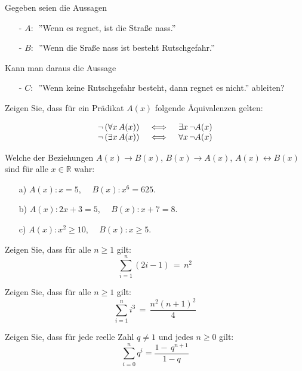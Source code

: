 \begin{aufgabe} Gegeben seien die Aussagen
\begin{itemize}
\item[-] $A:\,$ ''Wenn es regnet, ist die Straße nass.''
\item[-] $B:\,$ ''Wenn die Sraße nass ist besteht Rutschgefahr.''
\end{itemize}
Kann man daraus die Aussage
\begin{itemize}
\item[-] $C:\,$ ''Wenn keine Rutschgefahr besteht, dann regnet es nicht.'' ableiten? 
\end{itemize}
\end{aufgabe}

\begin{aufgabe}
Zeigen Sie, dass für ein Prädikat $A(x)$ folgende \"Aquivalenzen gelten:

  $$ \begin{array} {l c l}
  \neg \left( \forall x \, A(x) \right)  & \, \iff  \, & \exists x \, \neg A(x) \\
  \neg \left( \exists x  \, A(x) \right) & \iff & \forall x \, \neg A(x)
  \end{array} $$
\end{aufgabe}

\begin{aufgabe}
Welche der Beziehungen $A(x) \rightarrow B(x)$, 
$B(x) \rightarrow A(x)$, $A(x) \leftrightarrow B(x)$ sind für alle $x \in \mathbb R$ wahr:
\begin{itemize}
\item[a)] $A(x): x = 5$, $\quad B(x): x^6 = 625$.
\item[b)] $A(x): 2x + 3 = 5$, $\quad B(x): x + 7 = 8$.
\item[c)] $A(x): x^2 \geq 10$, $\quad B(x): x \geq 5$.
\end{itemize}
\end{aufgabe}

\begin{aufgabe} Zeigen Sie, dass für alle $n \geq 1$ gilt:
  $$ \sum_{i=1}^n (2i - 1) \, = \, n^2 $$
\end{aufgabe}

\begin{aufgabe} Zeigen Sie, dass für alle $n \geq 1$ gilt:
  $$ \sum_{i=1}^n  i^3 \, = \, \frac { n^2(n+1)^2}{4}  $$
\end{aufgabe} 

\begin{aufgabe}\label{logik_aufgabe_6} Zeigen Sie, dass für jede reelle Zahl $q \neq 1$ und jedes 
$n \geq 0$ gilt:
  $$ \sum_{i =0}^n q^i = \frac {1 - \,q^{n+1}}{1 - q} $$
\end{aufgabe}

